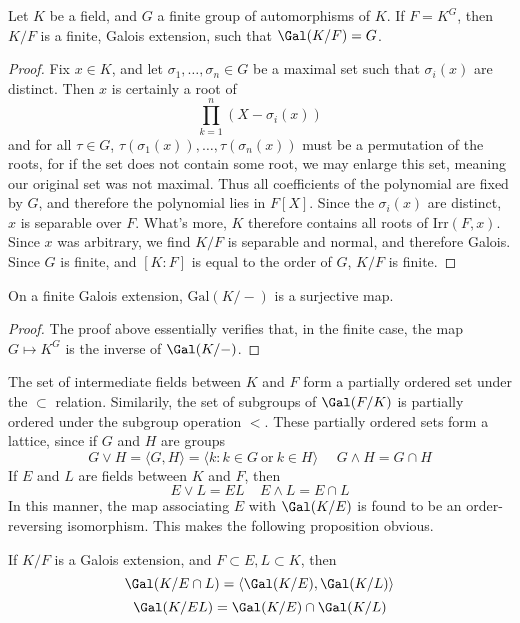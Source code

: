 \begin{theorem}[Artin]
    Let $K$ be a field, and $G$ a finite group of automorphisms of $K$. If $F = K^G$, then $K/F$ is a finite, Galois extension, such that $\Gal(K/F) = G$.
\end{theorem}
\begin{proof}
    Fix $x \in K$, and let $\sigma_1, \dots, \sigma_n \in G$ be a maximal set such that $\sigma_i(x)$ are distinct. Then $x$ is certainly a root of
    \[ \prod_{k = 1}^n (X - \sigma_i(x)) \]
    and for all $\tau \in G$, $\tau(\sigma_1(x)), \dots, \tau(\sigma_n(x))$ must be a permutation of the roots, for if the set does not contain some root, we may enlarge this set, meaning our original set was not maximal. Thus all coefficients of the polynomial are fixed by $G$, and therefore the polynomial lies in $F[X]$. Since the $\sigma_i(x)$ are distinct, $x$ is separable over $F$. What's more, $K$ therefore contains all roots of $\text{Irr}(F,x)$. Since $x$ was arbitrary, we find $K/F$ is separable and normal, and therefore Galois. Since $G$ is finite, and $[K:F]$ is equal to the order of $G$, $K/F$ is finite.
\end{proof}

\begin{corollary}
    On a finite Galois extension, $\text{Gal}(K/-)$ is a surjective map.
\end{corollary}
\begin{proof}
    The proof above essentially verifies that, in the finite case, the map $G \mapsto K^G$ is the inverse of $\Gal(K/-)$.
\end{proof}

The set of intermediate fields between $K$ and $F$ form a partially ordered set under the $\subset$ relation. Similarily, the set of subgroups of $\Gal(F/K)$ is partially ordered under the subgroup operation $<$. These partially ordered sets form a lattice, since if $G$ and $H$ are groups
%
\[ G \vee H = \langle G, H \rangle = \langle k : k \in G\ \text{or}\ k \in H \rangle\ \ \ \ \ \ G \wedge H = G \cap H \]
%
If $E$ and $L$ are fields between $K$ and $F$, then
%
\[ E \vee L = EL\ \ \ \ \ E \wedge L = E \cap L \]
%
In this manner, the map associating $E$ with $\Gal(K/E)$ is found to be an order-reversing isomorphism. This makes the following proposition obvious.

\begin{prop}
    If $K/F$ is a Galois extension, and $F \subset E,L \subset K$, then
    \[ \Gal(K/E \cap L) = \langle \Gal(K/E), \Gal(K/L) \rangle \]
    \[ \Gal(K/EL) = \Gal(K/E) \cap \Gal(K/L) \]
\end{prop}

